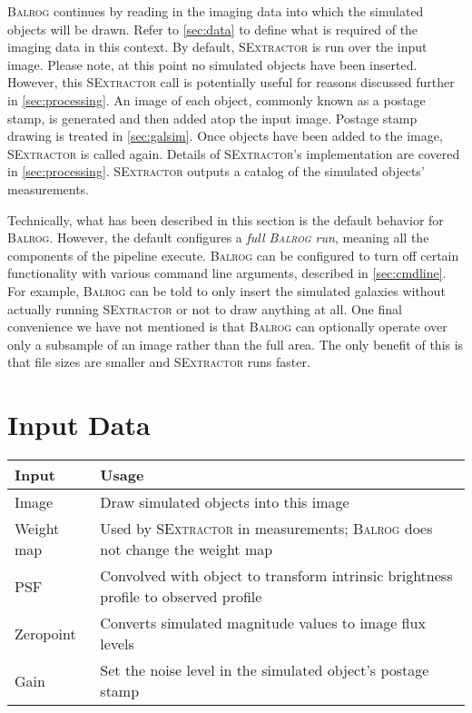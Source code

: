 \documentclass[11pt]{book}
\newcommand{\balrog}{\textsc{Balrog}}
\newcommand{\sex}{\textsc{SExtractor}}
\begin{document}
\balrog{} continues by reading in the imaging data into which the simulated objects will be drawn.
Refer to \autoref{sec:data} to define what is required of the imaging data in this context.
By default, \sex{} is run over the input image. Please note, at this point no simulated
objects have been inserted. However, this \sex{} call is potentially useful
for reasons discussed further in \autoref{sec:processing}.
An image of each object, commonly known as a postage stamp, is generated and then added atop the input image.
Postage stamp drawing is treated in \autoref{sec:galsim}.
Once objects have been added to the image, \sex{} is called again.
Details of \sex{}'s implementation are covered in \autoref{sec:processing}.
\sex{} outputs a catalog of the simulated objects' measurements.

Technically, what has been described in this section is the default behavior for \balrog{}.
However, the default configures a \textit{full \balrog{} run}, 
meaning all the components of the pipeline execute.
\balrog{} can be configured to turn off certain functionality with various command line arguments,
described in \autoref{sec:cmdline}.
For example, \balrog{} can be told to only insert the simulated galaxies without actually running \sex{}
or not to draw anything at all.
One final convenience we have not mentioned is that \balrog{} can optionally operate over only a subsample
of an image rather than the full area.
The only benefit of this is that file sizes are smaller and \sex{} runs faster.


\section{Input Data}
\label{sec:data}


\begin{table}
\caption{Brief summary of imaging inputs to \balrog{}.}
\label{tab:input}
\begin{longtabu} to \textwidth {l X}
\toprule %
{} \textbf{Input} & \textbf{Usage} \\ \midrule
Image & Draw simulated objects into this image\\
Weight map & Used by \sex{} in measurements; \balrog{} does not change the weight map\\
PSF & Convolved with object to transform intrinsic brightness profile to observed profile\\
Zeropoint & Converts simulated magnitude values to image flux levels\\
Gain & Set the noise level in the simulated object's postage stamp\\
\bottomrule %
\end{longtabu}
\end{table}
\end{document}
